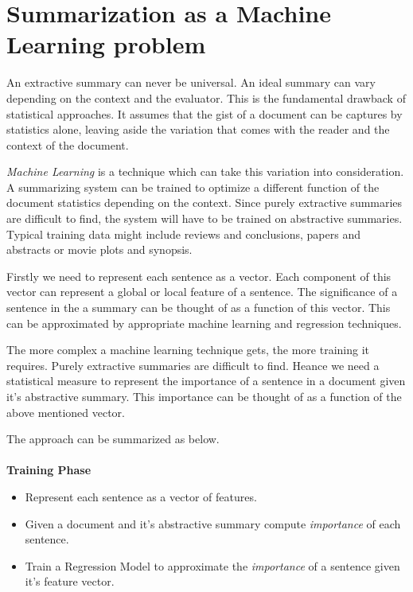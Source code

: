 \documentclass[paper=a4, fontsize=11pt]{scrartcl} %
\numberwithin{equation}{section} %
\numberwithin{figure}{section} %
\numberwithin{table}{section} %
\begin{document}

\section{Summarization as a Machine Learning problem}
An extractive summary can never be universal. An ideal summary can vary depending on the context and the evaluator. This is the fundamental drawback of statistical approaches. It assumes that the gist of a document can be captures by statistics alone, leaving aside the variation that comes with the reader and the context of the document.\\
\par
\emph{Machine Learning} is a technique which can take this variation into consideration. A summarizing system can be trained to optimize a different function of the document statistics depending on the context. Since purely extractive summaries are difficult to find, the system will have to be trained on abstractive summaries. Typical training data might include reviews and conclusions, papers and abstracts or movie plots and synopsis.\\
\par
Firstly we need to represent each sentence as a vector. Each component of this vector can represent a global or local feature of a sentence. The significance of a sentence in the a summary can be thought of as a function of this vector. This can be approximated by appropriate machine learning and regression techniques. \\
\par
The more complex a machine learning technique gets, the more training it requires. Purely extractive summaries are difficult to find. Heance we need a statistical measure to represent the importance of a sentence in a document given it's abstractive summary. This importance can be thought of as a function of the above mentioned vector. \\
\par
The approach can be summarized as below.\\
\\
\textbf{ Training Phase }
	\begin{itemize}
		\item Represent each sentence as a vector of features.
		\item Given a document and it's abstractive summary compute \emph{importance} of each sentence.
		\item Train a Regression Model to approximate the \emph{importance} of a sentence given it's feature vector.
	\end{itemize}
\end{document}

